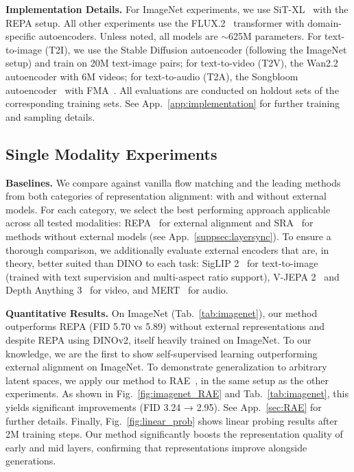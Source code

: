 \textbf{Implementation Details.} 
For ImageNet experiments, we use SiT-XL~\cite{sit} with the REPA setup. All other experiments use the FLUX.2~\cite{bfl2025representation} transformer with domain-specific autoencoders. Unless noted, all models are $\sim$625M parameters. For text-to-image (T2I), we use the Stable Diffusion autoencoder (following the ImageNet setup) and train on 20M text-image pairs; for text-to-video (T2V), the Wan2.2~\cite{wan2025} autoencoder with 6M videos; for text-to-audio (T2A), the Songbloom autoencoder~\cite{yang2025songbloom} with FMA~\citep{fma_dataset}. All evaluations are conducted on holdout sets of the corresponding training sets. See App.~\ref{app:implementation} for further training and sampling details.

\subsection{Single Modality Experiments}
\label{subsec:singlemodality}

\textbf{Baselines.} We compare against vanilla flow matching and the leading methods from both categories of representation alignment: with and without external models. For each category, we select the best performing approach applicable across all tested modalities: REPA~\citep{repa} for external alignment and SRA~\citep{sra} for methods without external models (see App.~\ref{suppsec:layersync}). To ensure a thorough comparison, we additionally evaluate external encoders that are, in theory, better suited than DINO to each task: SigLIP 2~\citep{siglip2} for text-to-image (trained with text supervision and multi-aspect ratio support), V-JEPA 2~\citep{bardes2024vjepa} and Depth Anything 3~\citep{da3} for video, and MERT~\citep{li2024mertacousticmusicunderstanding} for audio. 

\textbf{Quantitative Results.}
On ImageNet (Tab.~\ref{tab:imagenet}), our method outperforms REPA (FID 5.70 vs 5.89) without external representations and despite REPA using DINOv2, itself heavily trained on ImageNet. To our knowledge, we are the first to show self-supervised learning outperforming external alignment on ImageNet.
To demonstrate generalization to arbitrary latent spaces, we apply our method to 
RAE~\cite{rae}, in the same setup as the other experiments. As shown in Fig.~\ref{fig:imagenet_RAE} and Tab.~\ref{tab:imagenet}, this yields significant improvements (FID 3.24 → 2.95).
See App.~\ref{sec:RAE} for further details. Finally, Fig.~\ref{fig:linear_prob} shows linear probing results after 2M training steps. Our method significantly boosts the representation quality of early and mid layers, confirming that representations improve alongside generations.

